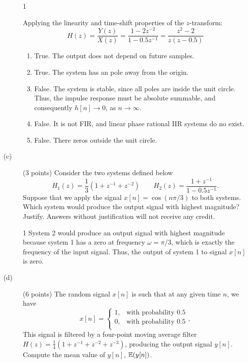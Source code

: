 \documentclass[10pt]{article}
\def\SOLUTIONS{0} %
\def\SolutionsColor{red2}
\begin{document}
\begin{description}
\if\SOLUTIONS1
{\color{\SolutionsColor} Applying the linearity and time-shift properties of the $z$-transform:
\begin{equation*}
H(z) = \frac{Y(z)}{X(z)} = \frac{1 - 2z^{-2}}{1 - 0.5z^{-1}} = \frac{z^2 - 2}{z(z - 0.5)}
\end{equation*}

\begin{enumerate}
  \item True. The output does not depend on future samples.
  \item True. The system has an pole away from the origin.
  \item False. The system is stable, since all poles are inside the unit circle. Thus, the impulse response must be absolute summable, and consequently $h[n] \to 0$, as $n\to\infty$.
  \item False. It is not FIR, and linear phase rational IIR systems do no exist.
  \item False. There zeros outside the unit circle.
\end{enumerate}
}
\else\vspace{4cm}
\fi

%
\item[(c)] (3 points) Consider the two systems defined below
\begin{equation}
	H_1(z) = \frac{1}{3}(1 + z^{-1} + z^{-2})\qquad H_2(z) = \frac{1 + z^{-1}}{1 - 0.5z^{-1}}.
\end{equation}
Suppose that we apply the signal $x[n] = \cos(n\pi/3)$ to both systems. Which system would produce the output signal with highest magnitude? Justify. Answers without justification will not receive any credit. 

\if\SOLUTIONS1
{\color{\SolutionsColor} 
System 2 would produce an output signal with highest magnitude because system 1 has a zero at frequency $\omega = \pi/3$, which is exactly the frequency of the input signal. Thus, the output of system 1 to signal $x[n]$ is zero.
}
\else\vspace{3cm}
\fi

\item[(d)] (6 points) The random signal $x[n]$ is such that at any given time $n$, we have
\begin{equation}
	x[n] = \begin{cases}
	1, &\text{with probability 0.5} \\
	0, &\text{with probability 0.5} \\
	\end{cases},
\end{equation}
This signal is filtered by a four-point moving average filter $H(z) = \frac{1}{4}(1 + z^{-1} + z^{-2} + z^{-3})$, producing the output signal $y[n]$. Compute the mean value of $y[n]$, $\operatorname{\mathbb{E}}(y[n])$.


\end{description}
\end{document}

